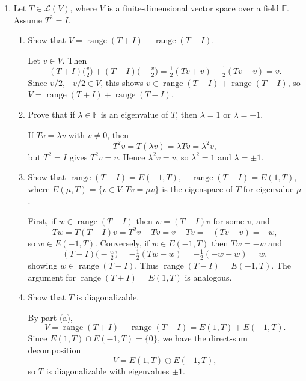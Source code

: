 


\begin{enumerate}
    \item Let $T\in\mathcal L(V)$, where $V$ is a finite-dimensional vector space over a field $\mathbb F$. Assume $T^2 = I$.
    \begin{enumerate}[label=\alph*.]
      \item Show that $V = \operatorname{range}(T+I)+\operatorname{range}(T-I)$.
        \begin{subprove}
          Let $v\in V$. Then
          $$
            (T+I)\bigl(\tfrac v2\bigr)+ (T-I)\bigl(-\tfrac v2\bigr)
            = \tfrac12(Tv+v)-\tfrac12(Tv-v)
            = v.
          $$
          Since $v/2, -v/2\in V$, this shows $v\in\operatorname{range}(T+I)+\operatorname{range}(T-I)$, so $V=\operatorname{range}(T+I)+\operatorname{range}(T-I)$.
        \end{subprove}
      \item Prove that if $\lambda\in\mathbb F$ is an eigenvalue of $T$, then $\lambda=1$ or $\lambda=-1$.
      \begin{subprove}
        If $Tv=\lambda v$ with $v\neq0$, then
        $$
          T^2v = T(\lambda v)=\lambda Tv=\lambda^2v,
        $$
        but $T^2=I$ gives $T^2v=v$. Hence $\lambda^2v=v$, so $\lambda^2=1$ and $\lambda=\pm1$.
      \end{subprove}
  
      \item Show that $\operatorname{range}(T-I)=E(-1,T), \quad \operatorname{range}(T+I)=E(1,T)$, where $E(\mu,T)=\{v\in V: Tv=\mu v\}$ is the eigenspace of $T$ for eigenvalue $\mu$.
      \begin{subprove}
        First, if $w\in\operatorname{range}(T-I)$ then $w=(T-I)v$ for some $v$, and
        $$
          Tw = T(T-I)v = T^2v - Tv = v - Tv = -(Tv - v) = -w,
        $$
        so $w\in E(-1,T)$. Conversely, if $w\in E(-1,T)$ then $Tw=-w$ and
        $$
          (T-I)\bigl(-\tfrac w2\bigr)
          = -\tfrac12(Tw-w)
          = -\tfrac12(-w-w)
          = w,
        $$
        showing $w\in\operatorname{range}(T-I)$. Thus $\operatorname{range}(T-I)=E(-1,T)$.
        The argument for $\operatorname{range}(T+I)=E(1,T)$ is analogous.
      \end{subprove}
      \item Show that $T$ is diagonalizable.
      \begin{subprove}
        By part (a),
        $$
          V = \operatorname{range}(T+I)+\operatorname{range}(T-I)
            = E(1,T)+E(-1,T).
        $$
        Since $E(1,T)\cap E(-1,T)=\{0\}$, we have the direct-sum decomposition
        $$
          V = E(1,T)\oplus E(-1,T),
        $$
        so $T$ is diagonalizable with eigenvalues $\pm1$.
      \end{subprove}
    \end{enumerate}
    
  
  
  \end{enumerate}